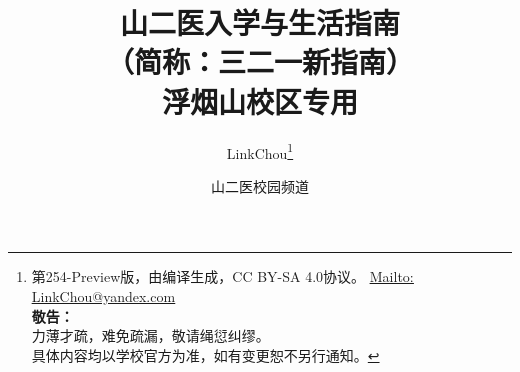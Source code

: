 

\title{%
\normalsize
{\Huge\textbf{山二医入学与生活指南}}\\
（简称：三二一新指南）\\[10pt]
{\large\textbf{浮烟山校区专用}}\vspace*{-20pt}}
\author{LinkChou\thanks{第254-Preview版，由\textit{\LaTeXe}编译生成，CC BY-SA 4.0协议。%
\uline{\href{Mailto:LinkChou@yandex.com}{Mailto: LinkChou@yandex.com}}\\%
\textbf{敬告：}\\%
\indent\indent 力薄才疏，难免疏漏，敬请绳愆纠缪。\\%
\indent\indent 具体内容均以学校官方为准，如有变更恕不另行通知。}\and 山二医校园频道}
\date{\DTMnow}
\maketitle

\renewcommand{\thefootnote}{\arabic{footnote}}

\tableofcontents